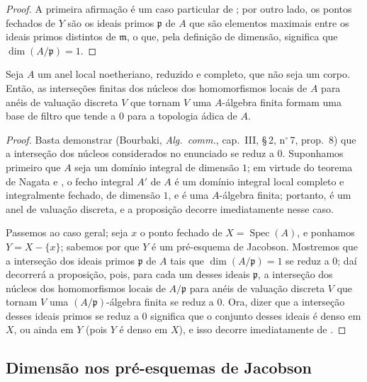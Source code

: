 \begin{proof}
A primeira afirmação é um caso particular de ; por outro lado, os pontos fechados de $Y$ são os ideais primos $\mathfrak{p}$ de $A$ que são elementos maximais entre os ideais primos distintos de $\mathfrak{m}$, o que, pela definição de dimensão, significa que $\dim(A/\mathfrak{p})=1$.
\end{proof}

\begin{proposition}[10.5.10]
\label{IV.10.5.10}
Seja $A$ um anel local noetheriano, reduzido e completo, que não seja um corpo.
Então, as interseções finitas dos núcleos dos homomorfismos locais de $A$ para anéis de valuação discreta $V$ que tornam $V$ uma $A$-álgebra finita formam uma base de filtro que tende a $0$ para a topologia ádica de $A$.
\end{proposition}

\begin{proof}
Basta demonstrar (Bourbaki, \emph{Alg.\ comm.}, cap.~III, \S\,2, n$^\circ$\,7, prop.~8) que a interseção dos núcleos considerados no enunciado se reduz a $0$.
Suponhamos primeiro que $A$ seja um domínio integral de dimensão $1$; em virtude do teorema de Nagata  e , o fecho integral $A'$ de $A$ é um domínio integral local completo e
integralmente fechado, de dimensão $1$, e é uma $A$-álgebra finita; portanto, é um anel de valuação discreta, e a proposição decorre imediatamente nesse caso.

Passemos ao caso geral; seja $x$ o ponto fechado de $X=\operatorname{Spec}(A)$, e ponhamos $Y=X-\{x\}$; sabemos por  que $Y$ é um pré-esquema de Jacobson.
Mostremos que a interseção dos ideais primos $\mathfrak{p}$ de $A$ tais que $\dim(A/\mathfrak{p})=1$ se reduz a $0$; daí decorrerá a proposição, pois, para cada um desses ideais $\mathfrak{p}$, a interseção dos núcleos dos homomorfismos locais de $A/\mathfrak{p}$ para anéis de valuação discreta $V$ que tornam $V$ uma $(A/\mathfrak{p})$-álgebra finita se reduz a $0$.
Ora, dizer que a interseção desses ideais primos se reduz a $0$ significa que o conjunto desses ideais é denso em $X$, ou ainda em $Y$ (pois $Y$ é denso em $X$), e isso decorre imediatamente de .
\end{proof}

\subsection{Dimensão nos pré-esquemas de Jacobson}
\label{subsection:IV.10.6}

